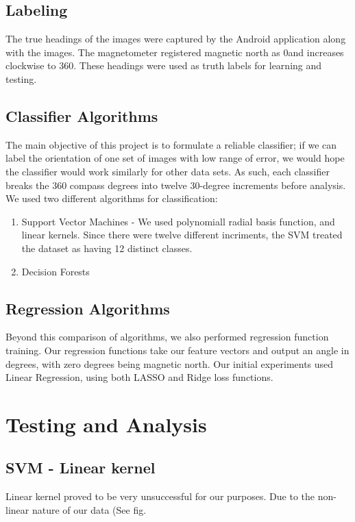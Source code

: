 \documentclass{article}
\begin{document}
\subsection{Labeling}
The true headings of the images were captured by the Android application along with the images. The magnetometer  registered magnetic north as 0\degrees and increases clockwise to 360\degrees. These headings were used as truth labels for learning and testing.

\subsection{Classifier Algorithms}
The main objective of this project is to formulate a reliable classifier; if we can label the orientation of one set of images with low range of error, we would hope the classifier would work similarly for other data sets. As such, each classifier breaks the 360 compass degrees into twelve 30-degree increments before analysis. We used two different algorithms for classification: 
\begin{enumerate}[1.]
\item Support Vector Machines - We used polynomiall radial basis function, and linear kernels. Since there were twelve different incriments, the SVM treated the dataset as having 12 distinct classes. 
\item Decision Forests
\end{enumerate}

\subsection{Regression Algorithms}
Beyond this comparison of algorithms, we also performed regression function training. Our regression functions take our feature vectors and output an angle in degrees, with zero degrees being magnetic north. Our initial experiments used Linear Regression, using both LASSO and Ridge loss functions. 

\section{Testing and Analysis}
\subsection{SVM - Linear kernel}
Linear kernel proved to be very unsuccessful for our purposes. Due to the non-linear nature of our data (See fig. 
\end{document}
